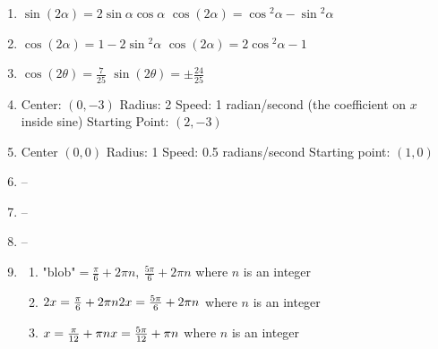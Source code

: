 \documentclass{article}
\begin{document}
\begin{enumerate}
\begin{enumerate}
	\item $\tan{(\theta + \frac{\pi}{2})} = -\frac{5}{2}$
	
	\item $\tan{(\theta + \pi)} = \frac{2}{5}$
	
	\end{enumerate}
	
\item $\sin{(2\alpha)} = 2 \sin{\alpha} \cos{\alpha}$ \newline
	$\cos{(2\alpha)} = \cos{^2\alpha} - \sin{^2\alpha}$

\item $\cos{(2 \alpha)} = 1 - 2 \sin{^2 \alpha}$ \newline
	$\cos{(2 \alpha)} = 2 \cos{^2 \alpha} - 1$

\item $\cos{(2 \theta)} = \frac{7}{25}$ \newline
	$\sin{(2 \theta)} = \pm \frac{24}{25}$

\item Center: $(0, -3)$ \newline
	Radius: 2 \newline
	Speed: 1 radian/second (the coefficient on $x$ inside sine) \newline
	Starting Point: $(2, -3)$
	
\item Center $(0, 0)$ \newline
	Radius: 1 \newline
	Speed: 0.5 radians/second \newline
	Starting point: $(1, 0)$

\item -- 

\item --

\item --

\item
	
	\begin{enumerate}
	
	\item "blob"$ = \frac{\pi}{6} + 2\pi n, \ \frac{5\pi}{6} + 2\pi n$ where $n$ is an integer
	
	\item $2x = \frac{\pi}{6} + 2\pi n \\
		2x = \frac{5\pi}{6} + 2\pi n$ where $n$ is an integer
		
	\item $x = \frac{\pi}{12} + \pi n \\
		x = \frac{5\pi}{12} + \pi n$ where $n$ is an integer
	

\end{enumerate}
\end{enumerate}
\end{document}
